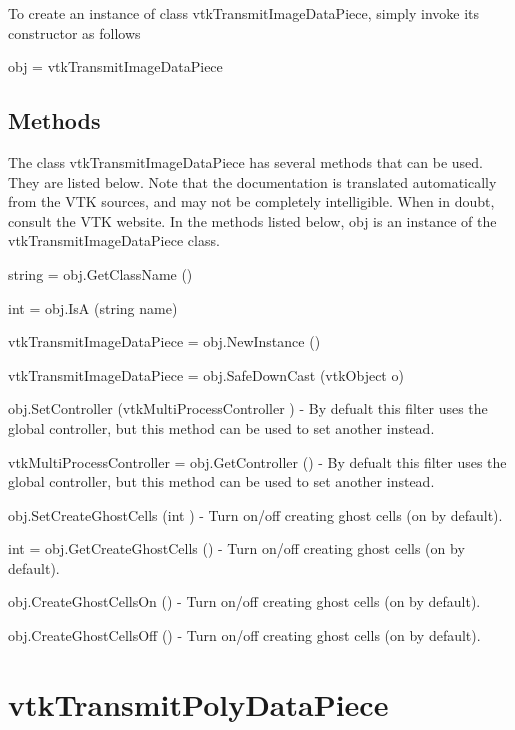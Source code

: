 To create an instance of class vtk\-Transmit\-Image\-Data\-Piece, simply invoke its constructor as follows \begin{DoxyVerb}  obj = vtkTransmitImageDataPiece
\end{DoxyVerb}
 \hypertarget{vtkwidgets_vtkxyplotwidget_Methods}{}\subsection{Methods}\label{vtkwidgets_vtkxyplotwidget_Methods}
The class vtk\-Transmit\-Image\-Data\-Piece has several methods that can be used. They are listed below. Note that the documentation is translated automatically from the V\-T\-K sources, and may not be completely intelligible. When in doubt, consult the V\-T\-K website. In the methods listed below, {\ttfamily obj} is an instance of the vtk\-Transmit\-Image\-Data\-Piece class. 
\begin{DoxyItemize}
\item {\ttfamily string = obj.\-Get\-Class\-Name ()}  
\item {\ttfamily int = obj.\-Is\-A (string name)}  
\item {\ttfamily vtk\-Transmit\-Image\-Data\-Piece = obj.\-New\-Instance ()}  
\item {\ttfamily vtk\-Transmit\-Image\-Data\-Piece = obj.\-Safe\-Down\-Cast (vtk\-Object o)}  
\item {\ttfamily obj.\-Set\-Controller (vtk\-Multi\-Process\-Controller )} -\/ By defualt this filter uses the global controller, but this method can be used to set another instead.  
\item {\ttfamily vtk\-Multi\-Process\-Controller = obj.\-Get\-Controller ()} -\/ By defualt this filter uses the global controller, but this method can be used to set another instead.  
\item {\ttfamily obj.\-Set\-Create\-Ghost\-Cells (int )} -\/ Turn on/off creating ghost cells (on by default).  
\item {\ttfamily int = obj.\-Get\-Create\-Ghost\-Cells ()} -\/ Turn on/off creating ghost cells (on by default).  
\item {\ttfamily obj.\-Create\-Ghost\-Cells\-On ()} -\/ Turn on/off creating ghost cells (on by default).  
\item {\ttfamily obj.\-Create\-Ghost\-Cells\-Off ()} -\/ Turn on/off creating ghost cells (on by default).  
\end{DoxyItemize}\hypertarget{vtkparallel_vtktransmitpolydatapiece}{}\section{vtk\-Transmit\-Poly\-Data\-Piece}\label{vtkparallel_vtktransmitpolydatapiece}
